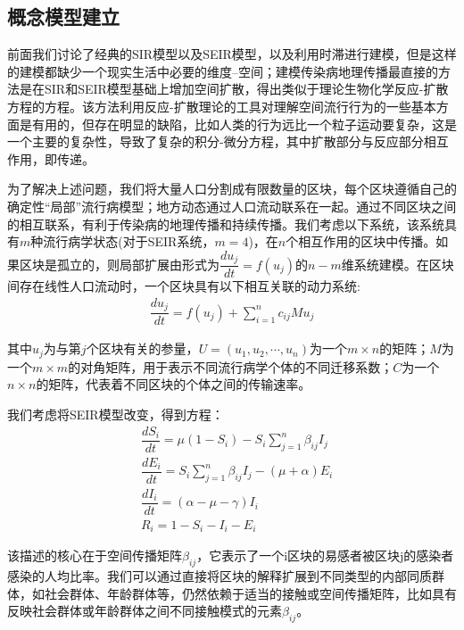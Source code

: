 \documentclass[UTF8]{ctexart}
\begin{document}
	\subsection{概念模型建立}
	前面我们讨论了经典的SIR模型以及SEIR模型，以及利用时滞进行建模，但是这样的建模都缺少一个现实生活中必要的维度--空间；建模传染病地理传播最直接的方法是在SIR和SEIR模型基础上增加空间扩散，得出类似于理论生物化学反应-扩散方程的方程。该方法利用反应-扩散理论的工具对理解空间流行行为的一些基本方面是有用的，但存在明显的缺陷，比如人类的行为远比一个粒子运动要复杂，这是一个主要的复杂性，导致了复杂的积分-微分方程，其中扩散部分与反应部分相互作用，即传递。
	\par 为了解决上述问题，我们将大量人口分割成有限数量的区块，每个区块遵循自己的确定性“局部”流行病模型；地方动态通过人口流动联系在一起。通过不同区块之间的相互联系，有利于传染病的地理传播和持续传播。我们考虑以下系统，该系统具有$m$种流行病学状态(对于SEIR系统，$m=4$)，在$n$个相互作用的区块中传播。如果区块是孤立的，则局部扩展由形式为$\dfrac{du_{j}}{dt}=f(u_{j})$的$n-m$维系统建模。在区块间存在线性人口流动时，一个区块具有以下相互关联的动力系统:
	\begin{equation}
		\begin{aligned}
			\dfrac{du_{j}}{dt}=f(u_{j})+\sum\limits_{i=1}^{n}c_{ij}Mu_{j}
		\end{aligned}
	\end{equation}
\par 其中$u_{j}$为与第$j$个区块有关的参量，$U=(u_{1},u_{2},\cdots ,u_{n})$为一个$m\times n$的矩阵；$M$为一个$m\times m$的对角矩阵，用于表示不同流行病学个体的不同迁移系数；$C$为一个$n\times n$的矩阵，代表着不同区块的个体之间的传输速率。
\par 我们考虑将SEIR模型改变，得到方程：
\begin{equation}
	\begin{aligned}
		&\dfrac{dS_{i}}{dt}=\mu (1-S_{i})-S_{i}\sum\limits_{j=1}^{n}\beta_{ij}I_{j}\\
		&\dfrac{dE_{i}}{dt}=S_{i}\sum\limits_{j=1}^{n}\beta_{ij}I_{j}-(\mu+\alpha)E_{i}\\
		&\dfrac{dI_{i}}{dt}=(\alpha-\mu-\gamma)I_{i}\\
		&R_{i}=1-S_{i}-I_{i}-E_{i}
	\end{aligned}
\end{equation}
\par 该描述的核心在于空间传播矩阵$\beta_{ij}$，它表示了一个i区块的易感者被区块j的感染者感染的人均比率。我们可以通过直接将区块的解释扩展到不同类型的内部同质群体，如社会群体、年龄群体等，仍然依赖于适当的接触或空间传播矩阵，比如具有反映社会群体或年龄群体之间不同接触模式的元素$\beta_{ij}$。
\end{document}

